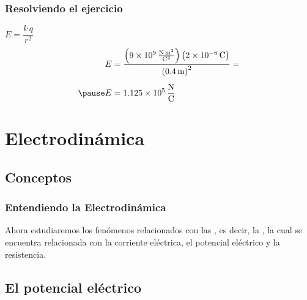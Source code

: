 \documentclass[14pt]{beamer}
\begin{document}
\begin{frame}
\frametitle{Resolviendo el ejercicio}
 \pause \quad $E = \dfrac{k \, q}{r^{2}}$ \\[0.5em] \pause
{} 
\begin{eqnarray*}
\begin{aligned}
E &= \dfrac{\left(\SI[per-mode=fraction]{9d9}{\newton\square\meter\per\square\coulomb}\right)\left(\SI{2d-6}{\coulomb}\right)}{\left(\SI{0.4}{\meter}\right)^{2}} = \\[0.5em] \pause 
E &= \SI[per-mode=fraction]{1.125d5}{\newton\per\coulomb}
\end{aligned}
\end{eqnarray*}
\end{frame}

\section{Electrodinámica}
\subsection{Conceptos}

\begin{frame}
\frametitle{Entendiendo la Electrodinámica}
Ahora estudiaremos los fenómenos relacionados con las , \pause es decir, la , \pause la cual se encuentra relacionada con la corriente eléctrica, el potencial eléctrico y la resistencia.
\end{frame}

\subsection{El potencial eléctrico}
\end{document}
